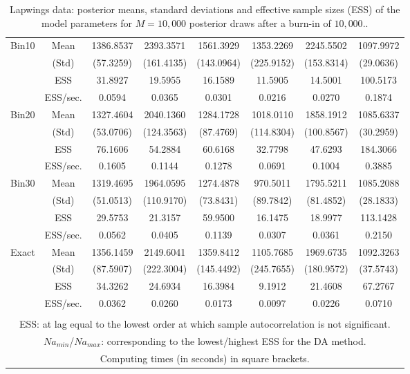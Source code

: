 {{\begin{table}
\begin{tabular}{cc cccc cc}
\rowcolor{LightCyan}Bin10 & Mean 
 & 1386.8537  & 2393.3571  & 1561.3929  & 1353.2269  & 2245.5502  & 1097.9972  \\  [0.75ex] 
 & (Std) 
 & (57.3259)  & (161.4135)  & (143.0964)  & (225.9152)  & (153.8314)  & (29.0636)  \\  [0.75ex] 
 & ESS 
 & 31.8927  & 19.5955  & 16.1589  & 11.5905  & 14.5001  & 100.5173  \\  [0.75ex] 
[536.47 s]  & ESS/sec. 
& 0.0594 & 0.0365 & 0.0301 & 0.0216 & 0.0270 & 0.1874  \\  [1.3ex] 
\rowcolor{LightCyan}Bin20 & Mean 
 & 1327.4604  & 2040.1360  & 1284.1728  & 1018.0110  & 1858.1912  & 1085.6337  \\  [0.75ex] 
 & (Std) 
 & (53.0706)  & (124.3563)  & (87.4769)  & (114.8304)  & (100.8567)  & (30.2959)  \\  [0.75ex] 
 & ESS 
 & 76.1606  & 54.2884  & 60.6168  & 32.7798  & 47.6293  & 184.3066  \\  [0.75ex] 
[474.46 s]  & ESS/sec. 
& 0.1605 & 0.1144 & 0.1278 & 0.0691 & 0.1004 & 0.3885  \\  [1.3ex] 
\rowcolor{LightCyan}Bin30 & Mean 
 & 1319.4695  & 1964.0595  & 1274.4878  & 970.5011  & 1795.5211  & 1085.2088  \\  [0.75ex] 
 & (Std) 
 & (51.0513)  & (110.9170)  & (73.8431)  & (89.7842)  & (81.4852)  & (28.1833)  \\  [0.75ex] 
 & ESS 
 & 29.5753  & 21.3157  & 59.9500  & 16.1475  & 18.9977  & 113.1428  \\  [0.75ex] 
[526.24 s]  & ESS/sec. 
& 0.0562 & 0.0405 & 0.1139 & 0.0307 & 0.0361 & 0.2150  \\  [1.3ex] 
\rowcolor{LightCyan} Exact & Mean 
 & 1356.1459  & 2149.6041  & 1359.8412  & 1105.7685  & 1969.6735  & 1092.3263  \\  [0.75ex] 
 & (Std) 
 & (87.5907)  & (222.3004)  & (145.4492)  & (245.7655)  & (180.9572)  & (37.5743)  \\  [0.75ex] 
 & ESS 
 & 34.3262  & 24.6934  & 16.3984  & 9.1912  & 21.4608  & 67.2767  \\  [0.75ex] 
[948.12 s]  & ESS/sec. 
& 0.0362 & 0.0260 & 0.0173 & 0.0097 & 0.0226 & 0.0710  \\  [1.3ex] 
 \\  \hline 
\multicolumn{8}{p{11cm}}{\footnotesize{ESS: at lag equal to the lowest order at which sample autocorrelation is not significant.}}  \\ 
\multicolumn{8}{p{11cm}}{\footnotesize{$Na_{min}$/$Na_{max}$: corresponding to the lowest/highest ESS for the DA method.}}  \\ 
\multicolumn{8}{p{11cm}}{\footnotesize{Computing times  (in seconds) in square brackets.}}  \\ 
\end{tabular}
\caption{Lapwings data: posterior means, standard deviations and effective sample sizes (ESS) of the model parameters for $M=10,000$ posterior draws after a burn-in of $10,000$..}
\label{tab:BKM_Na_1}  
\end{table}
}} \normalsize